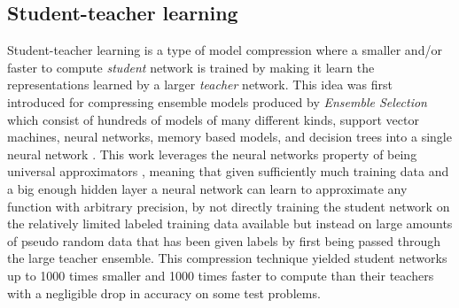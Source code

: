 \documentclass{kththesis}
\newcommand{\bibentry}[1]{\parencite{#1}}
\begin{document}
\subsection{Student-teacher learning}
Student-teacher learning is a type of model compression where a smaller and/or
faster to compute \emph{student} network is trained by making it learn the
representations learned by a larger \emph{teacher} network. This idea was first
introduced for compressing ensemble models produced by \emph{Ensemble Selection}
\bibentry{caruana2004ensemble} which consist of hundreds of models of many
different kinds, support vector machines, neural networks, memory based models,
and decision trees into a single neural network \bibentry{bucilua2006model}.
This work leverages the neural networks property of being universal
approximators \bibentry{cybenko1989approximation}, meaning that given
sufficiently much training data and a big enough hidden layer a neural network
can learn to approximate any function with arbitrary precision, by not directly
training the student network on the relatively limited labeled training data
available but instead on large amounts of pseudo random data that has been given
labels by first being passed through the large teacher ensemble. This
compression technique yielded student networks up to 1000 times smaller and 1000
times faster to compute than  their teachers with a negligible drop in accuracy
on some test problems. 
\end{document}
